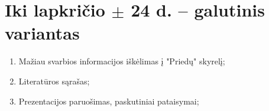 \documentclass[a4paper]{article}
\begin{document}
\section{ Iki lapkričio $\pm$ 24 d. -- galutinis variantas}

\begin{enumerate}
\item {Mažiau svarbios informacijos iškėlimas į "Priedų" skyrelį;}
\item {Literatūros sąrašas;}
\item {Prezentacijos paruošimas, paskutiniai pataisymai;}

\end{enumerate}
\end{document}
